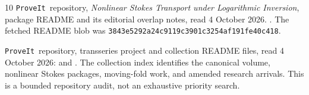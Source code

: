 \documentclass[11pt,a4paper]{article}
\theoremstyle{definition}
\theoremstyle{remark}
\newcommand{\repo}{\texttt{ProveIt}}
\numberwithin{equation}{section}
\begin{document}
\begin{thebibliography}{10}
\repo\ repository, \emph{Nonlinear Stokes Transport under Logarithmic Inversion}, package README and its editorial overlap notes, read 4 October 2026.
.
The fetched README blob was \texttt{3843e5292a24c9119c3901c3254af191fe40c418}.

\repo\ repository, transseries project and collection README files, read 4 October 2026:
 and
.
The collection index identifies the canonical volume, nonlinear Stokes packages, moving-fold work, and amended research arrivals. This is a bounded repository audit, not an exhaustive priority search.
\end{thebibliography}
\end{document}

